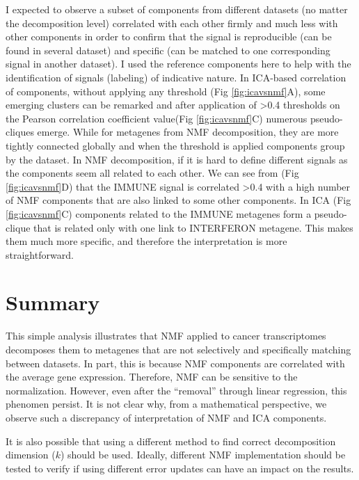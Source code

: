 \documentclass[12pt,]{book}
\theoremstyle{definition}
\theoremstyle{definition}
\theoremstyle{definition}
\theoremstyle{remark}
\begin{document}
I expected to observe a subset of components from different datasets (no
matter the decomposition level) correlated with each other firmly and
much less with other components in order to confirm that the signal is
reproducible (can be found in several dataset) and specific (can be
matched to one corresponding signal in another dataset). I used the
reference components here to help with the identification of signals
(labeling) of indicative nature. In ICA-based correlation of components,
without applying any threshold (Fig \ref{fig:icavsnmf}A), some emerging
clusters can be remarked and after application of \textgreater{}0.4
thresholds on the Pearson correlation coefficient value(Fig
\ref{fig:icavsnmf}C) numerous pseudo-cliques emerge. While for metagenes
from NMF decomposition, they are more tightly connected globally and
when the threshold is applied components group by the dataset. In NMF
decomposition, if it is hard to define different signals as the
components seem all related to each other. We can see from (Fig
\ref{fig:icavsnmf}D) that the IMMUNE signal is correlated
\textgreater{}0.4 with a high number of NMF components that are also
linked to some other components. In ICA (Fig \ref{fig:icavsnmf}C)
components related to the IMMUNE metagenes form a pseudo-clique that is
related only with one link to INTERFERON metagene. This makes them much
more specific, and therefore the interpretation is more straightforward.

\hypertarget{summary-3}{%
\section{Summary}\label{summary-3}}

This simple analysis illustrates that NMF applied to cancer
transcriptomes decomposes them to metagenes that are not selectively and
specifically matching between datasets. In part, this is because NMF
components are correlated with the average gene expression. Therefore,
NMF can be sensitive to the normalization. However, even after the
``removal'' through linear regression, this phenomen persist. It is not
clear why, from a mathematical perspective, we observe such a
discrepancy of interpretation of NMF and ICA components.

It is also possible that using a different method to find correct
decomposition dimension (\(k\)) should be used. Ideally, different NMF
implementation should be tested to verify if using different error
updates can have an impact on the results.
\end{document}
